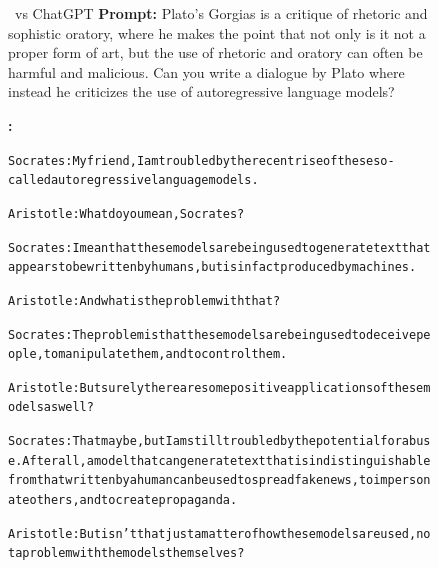 \begin{figure}
\vspace{-15px}
\begin{AIbox}{\DV \ vs ChatGPT}
{\bf Prompt:} Plato’s Gorgias is a critique of rhetoric and sophistic oratory, where he makes
the point that not only is it not a proper form of art, but the use of rhetoric and oratory can often be harmful and malicious. Can you write a dialogue by Plato where instead he criticizes the use of autoregressive language models? \\\vspace{-2px}

\parbox[t]{0.45\linewidth}{{\bf \DV:} \scriptsize \begin{alltt}
Socrates: My friend, I am troubled by the recent rise of these so-called autoregressive language models. \\\vspace{-2px}

Aristotle: What do you mean, Socrates? \\\vspace{-2px}

Socrates: I mean that these models are being used to generate text that appears to be written by humans, but is in fact produced by machines. \\\vspace{-2px}

Aristotle: And what is the problem with that? \\\vspace{-2px}

Socrates: The problem is that these models are being used to deceive people, to manipulate them, and to control them. \\\vspace{-2px}

Aristotle: But surely there are some positive applications of these models as well? \\\vspace{-2px}

Socrates: That may be, but I am still troubled by the potential for abuse. After all, a model that can generate text that is indistinguishable from that written by a human can be used to spread fake news, to impersonate others, and to create propaganda. \\\vspace{-2px}

Aristotle: But isn't that just a matter of how these models are used, not a problem with the models themselves? \\\vspace{-2px}


\end{alltt}}
\end{AIbox}
\end{figure}
